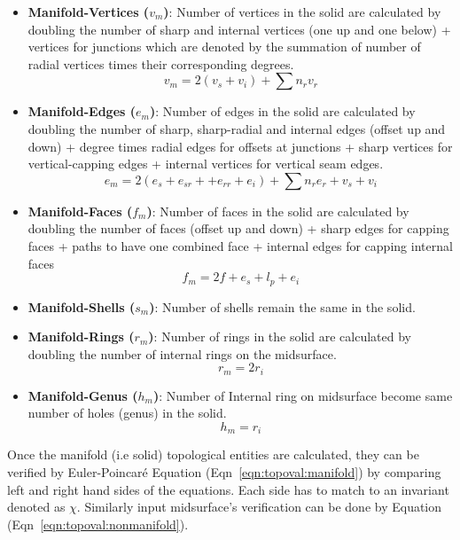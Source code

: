 \begin{itemize}
[noitemsep,topsep=2pt,parsep=2pt,partopsep=2pt,label=\textbullet]
\item \textbf{Manifold-Vertices  ($v_m$)}: Number of vertices in the solid are calculated by doubling the number of sharp and internal vertices (one up  and  one below) + vertices for junctions which are denoted by the summation of  number of radial vertices times their corresponding degrees.
\begin{equation}
v_m = 2 (v_s + v_i) + \sum n_{r} v_{r} \label{eqn:topoval:vm}
\end{equation}
\item \textbf{Manifold-Edges ($e_m$)}: Number of edges in the solid are calculated by doubling the number of sharp, sharp-radial and internal edges (offset up and down) + degree times radial edges for offsets at junctions + sharp vertices for vertical-capping edges + internal vertices for vertical seam edges.
\begin{equation}
e_m = 2 (e_s + e_{sr} + + e_{rr} + e_i) + \sum n_r e_r  + v_s + v_i\label{eqn:topoval:em}
\end{equation}
\item \textbf{Manifold-Faces ($f_m$)}: Number of faces in the solid are calculated by doubling the number of faces (offset up and down) + sharp edges for capping faces + paths to have one combined face + internal edges for capping internal faces
\begin{equation}
f_m = 2f + e_s + l_p + e_i \label{eqn:topoval:fm}
\end{equation}
\item \textbf{Manifold-Shells ($s_m$)}: Number of shells remain the same in the solid.
\item \textbf{Manifold-Rings ($r_m$)}: Number of rings in the solid are calculated by doubling the number of internal rings on the midsurface.
\begin{equation}
r_m = 2r_i\label{eqn:topoval:rm}
\end{equation}
\item \textbf{Manifold-Genus ($h_m$)}: Number of Internal ring on midsurface become same number of holes (genus) in the solid.
\begin{equation}
h_m = r_i\label{eqn:topoval:hm}
\end{equation}
\end{itemize}

Once the manifold (i.e solid) topological entities are calculated, they can be verified by Euler-Poincar\'e Equation (Eqn~\ref{eqn:topoval:manifold}) by comparing left and right hand sides of the equations. Each side has to match to an invariant denoted as $\chi$.  Similarly input midsurface's verification can be done by Equation (Eqn~\ref{eqn:topoval:nonmanifold}).

